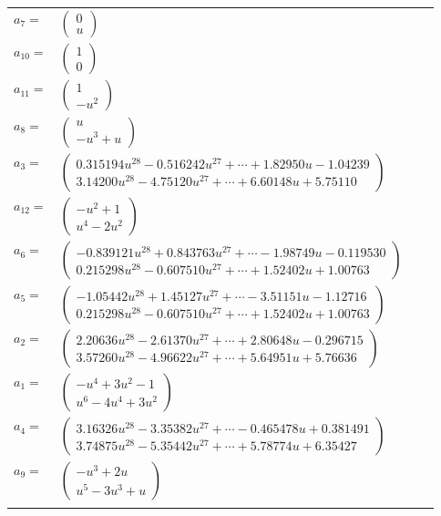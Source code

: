 \documentclass[1p]{elsarticle_modified}
\theoremstyle{definition}
\begin{document}
\begin{tabular}{m{7pt} m{180pt} m{7pt} m{180pt} }
\flushright $a_{7}=$&$\begin{pmatrix}0\\u\end{pmatrix}$ \\
\flushright $a_{10}=$&$\begin{pmatrix}1\\0\end{pmatrix}$ \\
\flushright $a_{11}=$&$\begin{pmatrix}1\\- u^2\end{pmatrix}$ \\
\flushright $a_{8}=$&$\begin{pmatrix}u\\- u^3+u\end{pmatrix}$ \\
\flushright $a_{3}=$&$\begin{pmatrix}0.315194 u^{28}-0.516242 u^{27}+\cdots+1.82950 u-1.04239\\3.14200 u^{28}-4.75120 u^{27}+\cdots+6.60148 u+5.75110\end{pmatrix}$ \\
\flushright $a_{12}=$&$\begin{pmatrix}- u^2+1\\u^4-2 u^2\end{pmatrix}$ \\
\flushright $a_{6}=$&$\begin{pmatrix}-0.839121 u^{28}+0.843763 u^{27}+\cdots-1.98749 u-0.119530\\0.215298 u^{28}-0.607510 u^{27}+\cdots+1.52402 u+1.00763\end{pmatrix}$ \\
\flushright $a_{5}=$&$\begin{pmatrix}-1.05442 u^{28}+1.45127 u^{27}+\cdots-3.51151 u-1.12716\\0.215298 u^{28}-0.607510 u^{27}+\cdots+1.52402 u+1.00763\end{pmatrix}$ \\
\flushright $a_{2}=$&$\begin{pmatrix}2.20636 u^{28}-2.61370 u^{27}+\cdots+2.80648 u-0.296715\\3.57260 u^{28}-4.96622 u^{27}+\cdots+5.64951 u+5.76636\end{pmatrix}$ \\
\flushright $a_{1}=$&$\begin{pmatrix}- u^4+3 u^2-1\\u^6-4 u^4+3 u^2\end{pmatrix}$ \\
\flushright $a_{4}=$&$\begin{pmatrix}3.16326 u^{28}-3.35382 u^{27}+\cdots-0.465478 u+0.381491\\3.74875 u^{28}-5.35442 u^{27}+\cdots+5.78774 u+6.35427\end{pmatrix}$ \\
\flushright $a_{9}=$&$\begin{pmatrix}- u^3+2 u\\u^5-3 u^3+u\end{pmatrix}$\\&\end{tabular}
\end{document}
